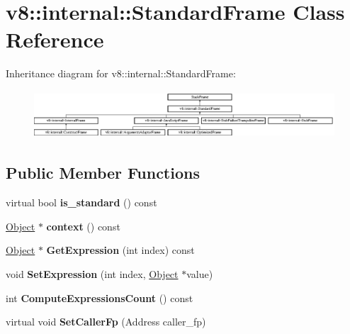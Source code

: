 \hypertarget{classv8_1_1internal_1_1_standard_frame}{}\section{v8\+:\+:internal\+:\+:Standard\+Frame Class Reference}
\label{classv8_1_1internal_1_1_standard_frame}
Inheritance diagram for v8\+:\+:internal\+:\+:Standard\+Frame\+:\begin{figure}[H]
\begin{center}
\leavevmode
\includegraphics[height=1.784861cm]{classv8_1_1internal_1_1_standard_frame}
\end{center}
\end{figure}
\subsection*{Public Member Functions}
\begin{DoxyCompactItemize}
\item 
\hypertarget{classv8_1_1internal_1_1_standard_frame_ac40dfd871582a663db83995b2c66c462}{}virtual bool {\bfseries is\+\_\+standard} () const \label{classv8_1_1internal_1_1_standard_frame_ac40dfd871582a663db83995b2c66c462}

\item 
\hypertarget{classv8_1_1internal_1_1_standard_frame_a655d97d869e1d0d2b8750c7b1d901309}{}\hyperlink{classv8_1_1internal_1_1_object}{Object} $\ast$ {\bfseries context} () const \label{classv8_1_1internal_1_1_standard_frame_a655d97d869e1d0d2b8750c7b1d901309}

\item 
\hypertarget{classv8_1_1internal_1_1_standard_frame_aa15b141e767fbcbe4597c9b1c5cfd6d9}{}\hyperlink{classv8_1_1internal_1_1_object}{Object} $\ast$ {\bfseries Get\+Expression} (int index) const \label{classv8_1_1internal_1_1_standard_frame_aa15b141e767fbcbe4597c9b1c5cfd6d9}

\item 
\hypertarget{classv8_1_1internal_1_1_standard_frame_af54efba3be436dc1db0e7303cdb61af5}{}void {\bfseries Set\+Expression} (int index, \hyperlink{classv8_1_1internal_1_1_object}{Object} $\ast$value)\label{classv8_1_1internal_1_1_standard_frame_af54efba3be436dc1db0e7303cdb61af5}

\item 
\hypertarget{classv8_1_1internal_1_1_standard_frame_a2e1ee00157cacd0225c22d596c02b34d}{}int {\bfseries Compute\+Expressions\+Count} () const \label{classv8_1_1internal_1_1_standard_frame_a2e1ee00157cacd0225c22d596c02b34d}

\item 
\hypertarget{classv8_1_1internal_1_1_standard_frame_aeaf5fa61cc07998425cc8b21f2451d53}{}virtual void {\bfseries Set\+Caller\+Fp} (Address caller\+\_\+fp)\label{classv8_1_1internal_1_1_standard_frame_aeaf5fa61cc07998425cc8b21f2451d53}

\end{DoxyCompactItemize}
